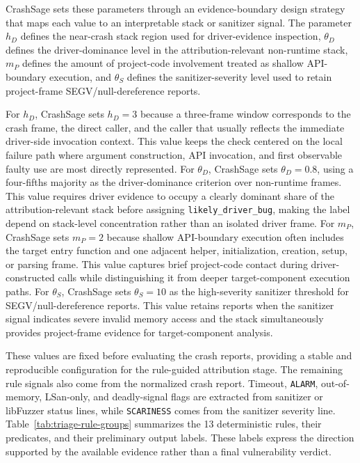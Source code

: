 \documentclass[pdflatex,sn-basic]{sn-jnl}%
\theoremstyle{thmstyleone}%
\theoremstyle{thmstyletwo}%
\theoremstyle{thmstylethree}%
\begin{document}
CrashSage sets these parameters through an evidence-boundary design strategy that maps each value to an interpretable stack or sanitizer signal.
The parameter \(h_D\) defines the near-crash stack region used for driver-evidence inspection, \(\theta_D\) defines the driver-dominance level in the attribution-relevant non-runtime stack, \(m_P\) defines the amount of project-code involvement treated as shallow API-boundary execution, and \(\theta_S\) defines the sanitizer-severity level used to retain project-frame SEGV/null-dereference reports.

For \(h_D\), CrashSage sets \(h_D=3\) because a three-frame window corresponds to the crash frame, the direct caller, and the caller that usually reflects the immediate driver-side invocation context.
This value keeps the check centered on the local failure path where argument construction, API invocation, and first observable faulty use are most directly represented.
For \(\theta_D\), CrashSage sets \(\theta_D=0.8\), using a four-fifths majority as the driver-dominance criterion over non-runtime frames.
This value requires driver evidence to occupy a clearly dominant share of the attribution-relevant stack before assigning \texttt{likely\_driver\_bug}, making the label depend on stack-level concentration rather than an isolated driver frame.
For \(m_P\), CrashSage sets \(m_P=2\) because shallow API-boundary execution often includes the target entry function and one adjacent helper, initialization, creation, setup, or parsing frame.
This value captures brief project-code contact during driver-constructed calls while distinguishing it from deeper target-component execution paths.
For \(\theta_S\), CrashSage sets \(\theta_S=10\) as the high-severity sanitizer threshold for SEGV/null-dereference reports.
This value retains reports when the sanitizer signal indicates severe invalid memory access and the stack simultaneously provides project-frame evidence for target-component analysis.

These values are fixed before evaluating the crash reports, providing a stable and reproducible configuration for the rule-guided attribution stage. The remaining rule signals also come from the normalized crash report.
Timeout, \texttt{ALARM}, out-of-memory, LSan-only, and deadly-signal flags are extracted from sanitizer or libFuzzer status lines, while \texttt{SCARINESS} comes from the sanitizer severity line.
Table~\ref{tab:triage-rule-groups} summarizes the 13 deterministic rules, their predicates, and their preliminary output labels.
These labels express the direction supported by the available evidence rather than a final vulnerability verdict.
\end{document}
